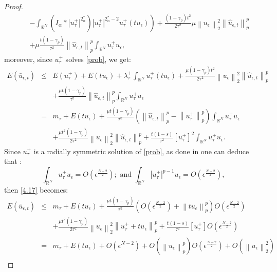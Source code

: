 \documentclass[11pt]{article}
\numberwithin{equation}{section}
\numberwithin{mytheorem}{section}
\begin{document}
\begin{proof}
\begin{eqnarray*}
				&& \left. -\int_{\mathbb{R}^N}(I_{\alpha}*|u_{\tau}^+|^{2^*_{\alpha}})|u_{\tau}^+|^{2^*_{\alpha}-2}u_{\tau}^+(tu_{\epsilon})\right)+\frac{(1-\gamma_p)t^2}{2\tau^2}\mu\left\| u_{\epsilon}\right\|_2^2\left\| \hat{u}_{\epsilon,t}\right\|_p^p\\
				&& +\mu\frac{t(1-\gamma_p)}{\tau^2}\left\| \hat{u}_{\epsilon,t}\right\|_p^p\int_{\mathbb{R}^N}u_{\tau}^+u_{\epsilon},
			\end{eqnarray*}
			moreover, since $u_{\tau}^+$ solves \eqref{prob}, we get:
			\begin{eqnarray}\label{4.17}
				E(\bar{u}_{\epsilon,t}) & \leq & E(u_{\tau}^+)+E(tu_{\epsilon})+\lambda_{\tau}^+\int_{\mathbb{R}^N}u_{\tau}^+(tu_{\epsilon})+\frac{\mu(1-\gamma_p)t^2}{2\tau^2}\left\| u_{\epsilon}\right\|_2^2\left\| \hat{u}_{\epsilon,t}\right\|_p^p\nonumber\\
				&& +\frac{\mu t(1-\gamma_p)}{\tau^2}\left\| \hat{u}_{\epsilon,t}\right\|_p^p\int_{\mathbb{R}^N}u_{\tau}^+u_{\epsilon}\nonumber\\
				& = & m_{\tau}+E(tu_{\epsilon})+\frac{\mu t(1-\gamma_p)}{\tau^2}\left(\left\| \hat{u}_{\epsilon,t}\right\|_p^p-\left\| u_{\tau}^+\right\|_p^p\right)\int_{\mathbb{R}^N}u_{\tau}^+u_{\epsilon}\nonumber\\
				&& +\frac{\mu t^2(1-\gamma_p)}{2\tau^2}\left\| u_{\epsilon}\right\|_2^2\left\| \hat{u}_{\epsilon,t}\right\|_p^p+\frac{t(1-s)}{\tau^2}[u_{\tau}^+]^2\int_{\mathbb{R}^N}u_{\tau}^+u_{\epsilon}.
			\end{eqnarray}
			Since $u_{\tau}^+$ is a radially symmetric solution of \eqref{prob}, as done in \cite[lemma~5.5]{Jeanjean2022multiple} one can deduce that :
			$$\int_{\mathbb{R}^N}u_{\tau}^+u_{\epsilon}=O(\epsilon^{\frac{N-2}{2}}); \text{ and } \int_{\mathbb{R}^N}|u_{\tau}^+|^{p-1}u_{\epsilon}=O(\epsilon^{\frac{N-2}{2}}),$$
			then \eqref{4.17} becomes:
			\begin{eqnarray*}
				E(\bar{u}_{\epsilon,t}) & \leq & m_{\tau}+E(tu_{\epsilon})+\frac{\mu t(1-\gamma_p)}{\tau^2}\left(O(\epsilon^{\frac{N-2}{2}})+\left\| tu_{\epsilon}\right\|_p^p\right)O(\epsilon^{\frac{N-2}{2}})\\
				&& +\frac{\mu t^2(1-\gamma_p)}{2\tau^2}\left\| u_{\epsilon}\right\|_2^2\left\| u_{\tau}^++tu_{\epsilon}\right\|_p^p+\frac{t(1-s)}{\tau^2}[u_{\tau}^+]O(\epsilon^{\frac{N-2}{2}})\\
				& = & m_{\tau} +E(tu_{\epsilon}) +O(\epsilon^{N-2})+O(\left\| u_{\epsilon}\right\|_p^p)O(\epsilon^{\frac{N-2}{2}}) +O(\left\| u_{\epsilon}\right\|_2^2)\\

\end{eqnarray*}
\end{proof}
\end{document}
